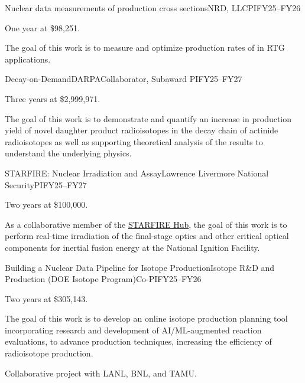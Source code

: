 \begin{rSubsection}{Nuclear data measurements of  production cross sections}{\textnormal{NRD, LLC}}{PI}{FY25--FY26}
\item    One year at \$98,251.
\item The goal of this work is to measure and optimize production rates of  in RTG applications.


\end{rSubsection}


\begin{rSubsection}{Decay-on-Demand}{\textnormal{DARPA}}{Collaborator, Subaward PI}{FY25--FY27}
\item    Three years at \$2,999,971.
\item The goal of this work is to demonstrate and quantify an increase in production yield of novel daughter product radioisotopes in the decay chain of actinide radioisotopes as well as supporting theoretical analysis of the results to understand the underlying physics.


\end{rSubsection}


\begin{rSubsection}{STARFIRE: Nuclear Irradiation and Assay}{\textnormal{Lawrence Livermore National Security}}{PI}{FY25--FY27}
\item    Two years at \$100,000.
\item As a collaborative member of the \href{https://ife.llnl.gov/starfire-hub}{STARFIRE Hub}, the goal of this work is to perform real-time irradiation of the final-stage optics and other critical optical components for inertial fusion energy at the National Ignition Facility.


\end{rSubsection}

\begin{rSubsection}{Building a Nuclear Data Pipeline for Isotope Production}{\textnormal{Isotope R\&D and Production (DOE Isotope Program)}}{Co-PI}{FY25--FY26}
\item    Two years at \$305,143.
\item The goal of this work is to develop an online isotope production planning tool incorporating research and development of AI/ML-augmented reaction evaluations, to  advance  production techniques, increasing the efficiency of radioisotope production.
\item Collaborative project with LANL, BNL, and TAMU.


\end{rSubsection}

